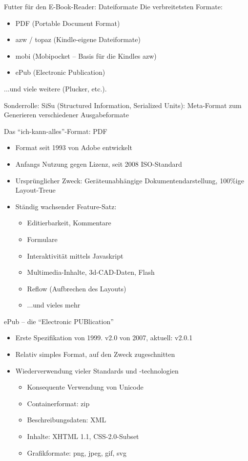 \begin{frame}{Futter für den E-Book-Reader: Dateiformate}
	Die verbreitetsten Formate:

	\begin{itemize}
		\item PDF (Portable Document Format)
		\item azw / topaz (Kindle-eigene Dateiformate)
		\item mobi (Mobipocket -- Basis für die Kindles azw)
		\item ePub (Electronic Publication)
	\end{itemize}

	...und viele weitere (Plucker, etc.).

	Sonderrolle: SiSu (Structured Information, Serialized Units): Meta-Format zum Generieren verschiedener Ausgabeformate
\end{frame}

\begin{frame}{Das "`ich-kann-alles"'-Format: PDF}
	\begin{itemize}
		\item Format seit 1993 von Adobe entwickelt
		\item Anfangs Nutzung gegen Lizenz, seit 2008 ISO-Standard
		\item Ursprünglicher Zweck: Geräteunabhängige Dokumentendarstellung, 100\%ige Layout-Treue
		\item Ständig wachsender Feature-Satz:
		\begin{itemize}
			\item Editierbarkeit, Kommentare
			\item Formulare
			\item Interaktivität mittels Javaskript
			\item Multimedia-Inhalte, 3d-CAD-Daten, Flash
			\item Reflow (Aufbrechen des Layouts)
			\item ...und vieles mehr
		\end{itemize}
	\end{itemize}
\end{frame}

\begin{frame}{ePub -- die "`Electronic PUBlication"'}
	\begin{itemize}
		\item Erste Spezifikation von 1999. v2.0 von 2007, aktuell: v2.0.1
		\item Relativ simples Format, auf den Zweck zugeschnitten
		\item Wiederverwendung vieler Standards und -technologien
		\begin{itemize}
			\item Konsequente Verwendung von Unicode
			\item Containerformat: zip
			\item Beschreibungsdaten: XML
			\item Inhalte: XHTML 1.1, CSS-2.0-Subset
			\item Grafikformate: png, jpeg, gif, svg
		\end{itemize}
	\end{itemize}
\end{frame}

